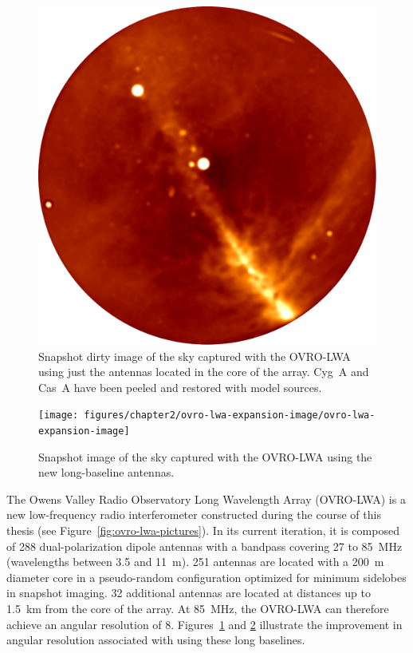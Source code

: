 \begin{bibunit}
\begin{figure}[t]
    \centering
    \includegraphics[width=\textwidth]{figures/chapter2/ovro-lwa-core-image}
    \caption{
        Snapshot dirty image of the sky captured with the OVRO-LWA using just the antennas located
        in the core of the array. Cyg~A and Cas~A have been peeled and restored with model sources.
    }
    \label{fig:core-snapshot-image}
\end{figure}

\begin{figure}[t]
    \centering
    \texttt{[image: figures/chapter2/ovro-lwa-expansion-image/ovro-lwa-expansion-image]}
    \caption{
        Snapshot image of the sky captured with the OVRO-LWA using the new long-baseline antennas.
    }
    \label{fig:expansion-snapshot-image}
\end{figure}

The Owens Valley Radio Observatory Long Wavelength Array (OVRO-LWA) is a new low-frequency radio
interferometer constructed during the course of this thesis (see
Figure~\ref{fig:ovro-lwa-pictures}). In its current iteration, it is composed of 288
dual-polarization dipole antennas with a bandpass covering 27 to 85~MHz (wavelengths between 3.5 and
11~m). 251 antennas are located with a 200~m diameter core in a pseudo-random configuration
optimized for minimum sidelobes in snapshot imaging. 32 additional antennas are located at distances
up to 1.5~km from the core of the array. At 85~MHz, the OVRO-LWA can therefore achieve an angular
resolution of 8\arcmin. Figures~\ref{fig:core-snapshot-image} and \ref{fig:expansion-snapshot-image}
illustrate the improvement in angular resolution associated with using these long baselines.


\end{bibunit}
